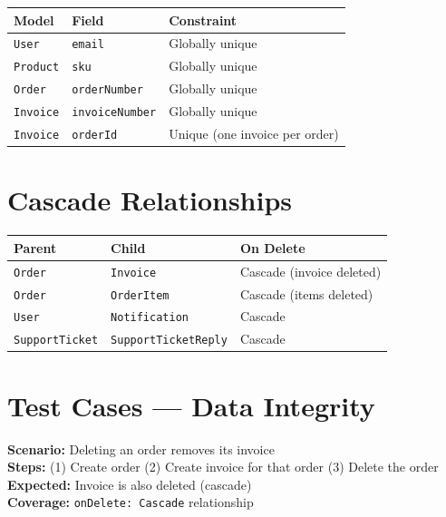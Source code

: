 \documentclass[12pt,a4paper]{report}
\newcommand{\pone}{\textbf{\color{p1red}P1}}
\begin{document}
\begin{center}
\begin{tabular}{lll}
  \toprule
  \textbf{Model} & \textbf{Field} & \textbf{Constraint} \\
  \midrule
  \texttt{User}    & \texttt{email}         & Globally unique \\
  \texttt{Product} & \texttt{sku}           & Globally unique \\
  \texttt{Order}   & \texttt{orderNumber}   & Globally unique \\
  \texttt{Invoice} & \texttt{invoiceNumber} & Globally unique \\
  \texttt{Invoice} & \texttt{orderId}       & Unique (one invoice per order) \\
  \bottomrule
\end{tabular}
\end{center}

\section{Cascade Relationships}

\begin{center}
\begin{tabular}{lll}
  \toprule
  \textbf{Parent} & \textbf{Child} & \textbf{On Delete} \\
  \midrule
  \texttt{Order}         & \texttt{Invoice}   & Cascade (invoice deleted) \\
  \texttt{Order}         & \texttt{OrderItem} & Cascade (items deleted) \\
  \texttt{User}          & \texttt{Notification} & Cascade \\
  \texttt{SupportTicket} & \texttt{SupportTicketReply} & Cascade \\
  \bottomrule
\end{tabular}
\end{center}

\section{Test Cases --- Data Integrity}

\begin{tcolorbox}[criticalbox, title={DB-004 \hfill \pone\ --- Cascade Delete}]
\textbf{Scenario:} Deleting an order removes its invoice \\
\textbf{Steps:} (1) Create order \quad (2) Create invoice for that order \quad (3) Delete the order \\
\textbf{Expected:} Invoice is also deleted (cascade) \\
\textbf{Coverage:} \texttt{onDelete: Cascade} relationship
\end{tcolorbox}
\end{document}
